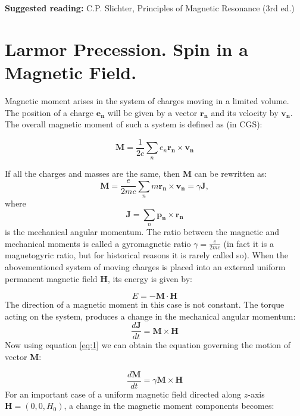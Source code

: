 \documentclass[a4paper, 12pt]{article}
\begin{document}
\textbf{Suggested reading:} C.P. Slichter, Principles of Magnetic Resonance (3rd ed.)

\section{Larmor Precession. Spin in a Magnetic Field.}
Magnetic moment arises in the system of charges moving in a limited volume. The position of a charge $\bm{e_n}$ will be given by a vector $\bm{r_n}$ and its velocity by $\bm{v_n}$. The overall magnetic moment of such a system is defined as (in CGS):

\begin{equation}
\bm{M} = \frac{1}{2c} \sum_{n} e_n\bm{r_n} \times \bm{v_n}
\end{equation}

If all the charges and masses are the same, then $\bm{M}$ can be rewritten as:
\begin{equation} \label{eq:1}
\bm{M} = \frac{e}{2mc} \sum_{n} m\bm{r_n} \times \bm{v_n} = \gamma \bm{J},
\end{equation}
where
\begin{equation}
\bm{J} = \sum_{n} \bm{p_n} \times \bm{r_n}
\end{equation}
is the mechanical angular momentum. The ratio between the magnetic and mechanical moments is called a gyromagnetic ratio $\gamma = \frac{e}{2mc}$ (in fact it is a magnetogyric ratio, but for historical reasons it is rarely called so).
When the abovementioned system of moving charges is placed into an external uniform permanent magnetic field $\bm{H}$, its energy is given by:

\begin{equation} \label{eq:2}
E = -\bm{M} \cdot \bm{H}
\end{equation}
The direction of a magnetic moment in this case is not constant. The torque acting on the system, produces a change in the mechanical angular momentum:
\begin{equation}
\frac{d\bm{J}}{dt} = \bm{M} \times \bm{H}
\end{equation}
Now using equation \ref{eq:1} we can obtain the equation governing the motion of vector $\bm{M}$:

\begin{equation} \label{eq:precession_compact}
\frac{d\bm{M}}{dt} = \gamma \bm{M} \times \bm{H}
\end{equation}
For an important case of a uniform magnetic field directed along $z$-axis $\bm{H} = (0, 0, H_0)$, a change in the magnetic moment components becomes:
\end{document}
